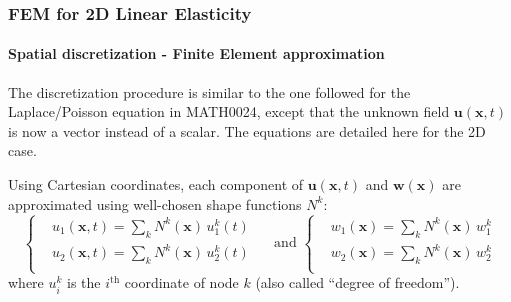 \documentclass[10pt,xcolor=pdftex,dvipsnames,table]{beamer}
\begin{document}
\begin{frame}
	\frametitle{ FEM for 2D Linear Elasticity }
	\framesubtitle{ Spatial discretization - Finite Element approximation }
	
	The discretization procedure is similar to the one followed for the Laplace/Poisson equation in MATH0024, except that the unknown field $\boldsymbol{u}(\boldsymbol{x}, t)$ is now a vector instead of a scalar.	The equations are detailed here for the 2D case.	
	
	Using Cartesian coordinates, each component of $\boldsymbol{u}(\boldsymbol{x}, t)$ and $\boldsymbol{w}(\boldsymbol{x})$ are approximated using well-chosen shape functions $N^k$:
	\begin{equation*}
		\left\{
		\begin{aligned}
			&u_1(\boldsymbol{x}, t) = \sum_k N^k(\boldsymbol{x})\,u_1^k(t) \\
			&u_2(\boldsymbol{x}, t) = \sum_k N^k(\boldsymbol{x})\,u_2^k(t) \\
		\end{aligned}
		\right.
		\quad
		\text{ and }
		\left\{
		\begin{aligned}
			&w_1(\boldsymbol{x}) = \sum_k N^k(\boldsymbol{x})\,w_1^k \\
			&w_2(\boldsymbol{x}) = \sum_k N^k(\boldsymbol{x})\,w_2^k \\
		\end{aligned}
		\right.		
	\end{equation*}	
	where $u_i^k$ is the $i^{\text{th}}$ coordinate of node $k$ (also called ``degree of freedom'').	
\end{frame}
\end{document}
